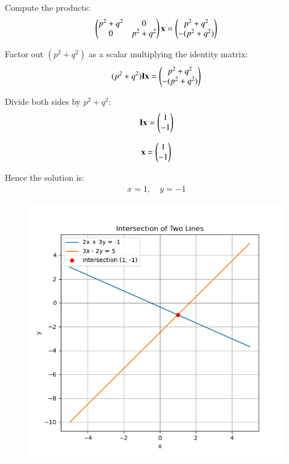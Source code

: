\documentclass[journal]{IEEEtran}
\begin{document}
Compute the products:
\begin{align}
\begin{pmatrix}p^2+q^2 & 0 \\ 0 & p^2+q^2\end{pmatrix} \mathbf{x} = \begin{pmatrix}p^2 + q^2 \\ -(p^2+q^2)\end{pmatrix}
\end{align}

Factor out $(p^2+q^2)$ as a scalar multiplying the identity matrix:
\begin{align}
(p^2+q^2) \mathbf{I} \mathbf{x} = \begin{pmatrix}p^2+q^2 \\ -(p^2+q^2)\end{pmatrix}
\end{align}

Divide both sides by $p^2+q^2$:
\begin{align}
\mathbf{I} \mathbf{x} = \begin{pmatrix}1 \\ -1\end{pmatrix}
\end{align}

\begin{align}
\mathbf{x} = \begin{pmatrix}1 \\ -1\end{pmatrix}
\end{align}

Hence the solution is:
\begin{align}
x = 1, \quad y = -1
\end{align}

\begin{figure}[H]
   \centering
   \includegraphics[width=0.7\columnwidth]{figs/fig1.png}
   \caption{}
   \label{Figure}
\end{figure}
\end{document}
